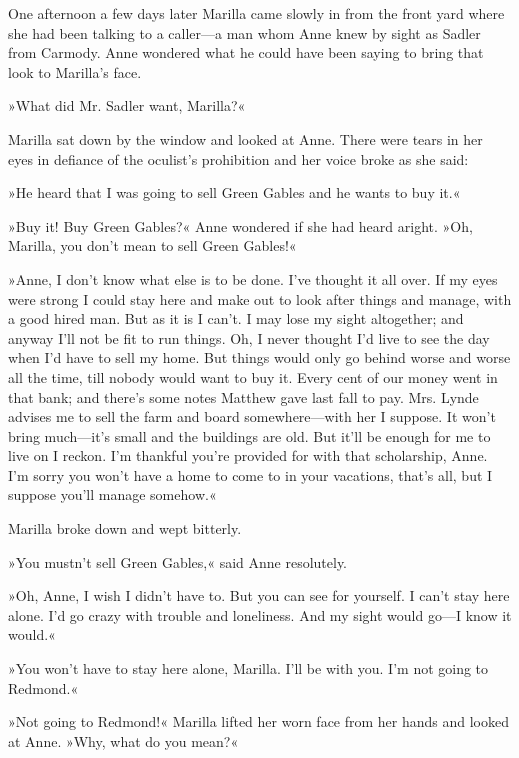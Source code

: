 One afternoon a few days later Marilla came slowly in from the front yard where she had been talking to a caller—a man whom Anne knew by sight as Sadler from Carmody. Anne wondered what he could have been saying to bring that look to Marilla’s face.

»What did Mr. Sadler want, Marilla?«

Marilla sat down by the window and looked at Anne. There were tears in her eyes in defiance of the oculist’s prohibition and her voice broke as she said:

»He heard that I was going to sell Green Gables and he wants to buy it.«

»Buy it! Buy Green Gables?« Anne wondered if she had heard aright. »Oh, Marilla, you don’t mean to sell Green Gables!«

»Anne, I don’t know what else is to be done. I’ve thought it all over. If my eyes were strong I could stay here and make out to look after things and manage, with a good hired man. But as it is I can’t. I may lose my sight altogether; and anyway I’ll not be fit to run things. Oh, I never thought I’d live to see the day when I’d have to sell my home. But things would only go behind worse and worse all the time, till nobody would want to buy it. Every cent of our money went in that bank; and there’s some notes Matthew gave last fall to pay. Mrs. Lynde advises me to sell the farm and board somewhere—with her I suppose. It won’t bring much—it’s small and the buildings are old. But it’ll be enough for me to live on I reckon. I’m thankful you’re provided for with that scholarship, Anne. I’m sorry you won’t have a home to come to in your vacations, that’s all, but I suppose you’ll manage somehow.«

Marilla broke down and wept bitterly.

»You mustn’t sell Green Gables,« said Anne resolutely.

»Oh, Anne, I wish I didn’t have to. But you can see for yourself. I can’t stay here alone. I’d go crazy with trouble and loneliness. And my sight would go—I know it would.«

»You won’t have to stay here alone, Marilla. I’ll be with you. I’m not going to Redmond.«

»Not going to Redmond!« Marilla lifted her worn face from her hands and looked at Anne. »Why, what do you mean?«


